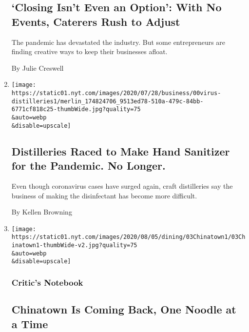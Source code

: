 \begin{enumerate}
  \hypertarget{closing-isnt-even-an-option-with-no-events-caterers-rush-to-adjust}{%
  \subsection{`Closing Isn't Even an Option': With No Events, Caterers
  Rush to
  Adjust}\label{closing-isnt-even-an-option-with-no-events-caterers-rush-to-adjust}}

  The pandemic has devastated the industry. But some entrepreneurs are
  finding creative ways to keep their businesses afloat.

  By Julie Creswell
\item
  \href{/2020/08/04/business/distilleries-hand-sanitizer-pandemic.html}{}

  \texttt{[image: https://static01.nyt.com/images/2020/07/28/business/00virus-distilleries1/merlin\_174824706\_9513ed78-510a-479c-84bb-6771cf818c25-thumbWide.jpg?quality=75\\\&auto=webp\\\&disable=upscale]}

  \hypertarget{distilleries-raced-to-make-hand-sanitizer-for-the-pandemic-no-longer}{%
  \subsection{Distilleries Raced to Make Hand Sanitizer for the
  Pandemic. No
  Longer.}\label{distilleries-raced-to-make-hand-sanitizer-for-the-pandemic-no-longer}}

  Even though coronavirus cases have surged again, craft distilleries
  say the business of making the disinfectant has become more difficult.

  By Kellen Browning
\item
  \href{/2020/08/03/dining/chinatown-outdoor-dining-coronavirus.html}{}

  \texttt{[image: https://static01.nyt.com/images/2020/08/05/dining/03Chinatown1/03Chinatown1-thumbWide-v2.jpg?quality=75\\\&auto=webp\\\&disable=upscale]}

  \hypertarget{critics-notebook-1}{%
  \subsubsection{Critic's Notebook}\label{critics-notebook-1}}

  \hypertarget{chinatown-is-coming-back-one-noodle-at-a-time}{%
  \subsection{Chinatown Is Coming Back, One Noodle at a
  Time}\label{chinatown-is-coming-back-one-noodle-at-a-time}}


\end{enumerate}
